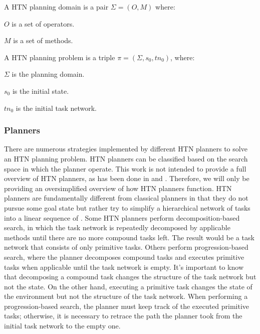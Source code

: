 \begin{Tdef}
    A  HTN planning domain is a pair $\Sigma= (O, M)$ where:
    \vspace{-0.5em}
    \begin{compactitem}
    \item 
    $O$ is a set of operators.
    \item 
    $M$ is a set of methods.
    \end{compactitem}
\end{Tdef}

\begin{Tdef}
    A HTN planning problem is a triple $\pi = (\Sigma,s_0,tn_0)$, where:
    \vspace{-0.5em}
    \begin{compactitem}
    \item 
    $\Sigma$ is the planning domain.
    \item 
    $s_0$ is the initial state.
    \item 
    $tn_0$ is the initial task network.
    \end{compactitem}
\end{Tdef}

\subsubsection{Planners}
There are numerous strategies implemented by different HTN planners to solve an HTN planning problem. HTN planners can be classified based on the search space in which the planner operate. This work is not intended to provide a full overview of HTN planners, as has been done in \cite{bercher_survey_2019} and \cite{OverviewHierarchicalTaskgeorgievski2014}. Therefore, we will only be providing an oversimplified overview of how HTN planners function. HTN planners are fundamentally different from classical planners in that they do not pursue some goal state but rather try to simplify a hierarchical network of tasks into a linear sequence of . Some HTN planners perform decomposition-based search, in which the task network is repeatedly decomposed by applicable methods until there are no more compound tasks left. The result would be a task network that consists of only primitive tasks. Others perform progression-based search, where the planner decomposes compound tasks and executes primitive tasks when applicable until the task network is empty. It's important to know that decomposing a compound task changes the structure of the task network but not the state. On the other hand, executing a primitive task changes the state of the environment but not the structure of the task network. When performing a progression-based search, the planner must keep track of the executed primitive tasks; otherwise, it is necessary to retrace the path the planner took from the initial task network to the empty one.